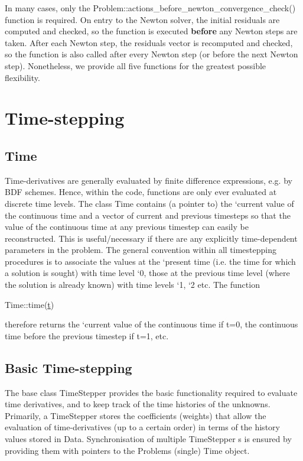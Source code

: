 In many cases, only the {\ttfamily Problem\+::actions\+\_\+before\+\_\+newton\+\_\+convergence\+\_\+check()} function is required. On entry to the Newton solver, the initial residuals are computed and checked, so the function is executed {\bfseries before} any Newton steps are taken. After each Newton step, the residuals vector is recomputed and checked, so the function is also called after every Newton step (or before the next Newton step). Nonetheless, we provide all five functions for the greatest possible flexibility.\hypertarget{index_timestepping}{}\section{Time-\/stepping}\label{index_timestepping}
\hypertarget{index_time}{}\subsection{Time}\label{index_time}
Time-\/derivatives are generally evaluated by finite difference expressions, e.\+g. by B\+DF schemes. Hence, within the code, functions are only ever evaluated at discrete time levels. The class {\ttfamily Time} contains (a pointer to) the `current\textquotesingle{} value of the continuous time and a vector of current and previous timesteps so that the value of the continuous time at any previous timestep can easily be reconstructed. This is useful/necessary if there are any explicitly time-\/dependent parameters in the problem. The general convention within all timestepping procedures is to associate the values at the `present\textquotesingle{} time (i.\+e. the time for which a solution is sought) with time level `0\textquotesingle{}, those at the previous time level (where the solution is already known) with time levels `1\textquotesingle{}, `2\textquotesingle{} etc. The function 
\begin{DoxyCode}
Time::time(\hyperlink{cfortran_8h_af6f0bd3dc13317f895c91323c25c2b8f}{t}) 
\end{DoxyCode}
 therefore returns the `current\textquotesingle{} value of the continuous time if t=0, the continuous time before the previous timestep if t=1, etc.\hypertarget{index_basic_timestepping}{}\subsection{Basic Time-\/stepping}\label{index_basic_timestepping}
The base class {\ttfamily Time\+Stepper} provides the basic functionality required to evaluate time derivatives, and to keep track of the time histories of the unknowns. Primarily, a {\ttfamily Time\+Stepper} stores the coefficients (weights) that allow the evaluation of time-\/derivatives (up to a certain order) in terms of the history values stored in {\ttfamily Data}. Synchronisation of multiple {\ttfamily Time\+Stepper} s is ensured by providing them with pointers to the {\ttfamily Problem\textquotesingle{}s} (single) {\ttfamily Time} object.

